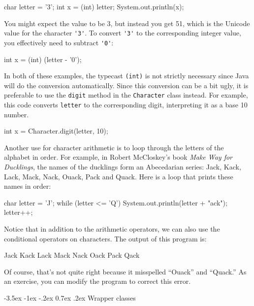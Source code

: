 \documentclass[12pt]{book}
\makeatletter
\theoremstyle{exercise}
\newcommand{\java}[1]{\verb"#1"}
\renewcommand{\section}{\@startsection {section}{1}{\z@}%
    {-3.5ex \@plus -1ex \@minus -.2ex}%
    {0.7ex \@plus.2ex}%
    {\normalfont\Large\bfseries}}
\newcommand{\java}[1]{\lstinline{#1}} %
\makeatother
\begin{document}
\begin{code}
    char letter = '3';
    int x = (int) letter;
    System.out.println(x);
\end{code}

You might expect the value to be 3, but instead you get 51, which is the Unicode value for the character \java{'3'}.
To convert \java{'3'} to the corresponding integer value, you effectively need to subtract \java{'0'}:

\begin{code}
    int x = (int) (letter - '0');
\end{code}

In both of these examples, the typecast \java{(int)} is not strictly necessary since Java will do the conversion automatically.
Since this conversion can be a bit ugly, it is preferable to use the \java{digit} method in the \java{Character} class instead.
For example, this code converts \java{letter} to the corresponding digit, interpreting it as a base 10 number.

\begin{code}
    int x = Character.digit(letter, 10);
\end{code}

Another use for character arithmetic is to loop through the letters of the alphabet in order.
For example, in Robert McCloskey's book {\em Make Way for Ducklings}, the names of the ducklings form an Abecedarian series: Jack, Kack, Lack, Mack, Nack, Ouack, Pack and Quack.
Here is a loop that prints these names in order:

\begin{code}
    char letter = 'J';
    while (letter <= 'Q') {
        System.out.println(letter + "ack");
        letter++;
    }
\end{code}

Notice that in addition to the arithmetic operators, we can also use the conditional operators on characters.
The output of this program is:

\begin{stdout}
Jack
Kack
Lack
Mack
Nack
Oack
Pack
Qack
\end{stdout}

Of course, that's not quite right because it misspelled ``Ouack'' and ``Quack.''
As an exercise, you can modify the program to correct this error.


\section{Wrapper classes}
\end{document}
